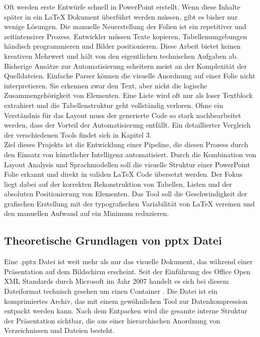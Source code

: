 \documentclass[a4paper]{article}
\begin{document}
 Oft werden erste Entwürfe schnell in PowerPoint erstellt. Wenn diese Inhalte später in ein LaTeX Dokument überführt werden müssen, gibt es bisher nur wenige Lösungen. Die manuelle Neuerstellung der Folien ist ein repetitiver und zeitintensiver Prozess. Entwickler müssen Texte kopieren, Tabellenumgebungen händisch programmieren und Bilder positionieren. Diese Arbeit bietet keinen kreativen Mehrwert und hält von den eigentlichen technischen Aufgaben ab. \\

Bisherige Ansätze zur Automatisierung scheitern meist an der Komplexität der Quelldateien. Einfache Parser können die visuelle Anordnung auf einer Folie nicht interpretieren. Sie erkennen zwar den Text, aber nicht die logische Zusammengehörigkeit von Elementen. Eine Liste wird oft nur als loser Textblock extrahiert und die Tabellenstruktur geht vollständig verloren. Ohne ein Verständnis für das Layout muss der generierte Code so stark nachbearbeitet werden, dass der Vorteil der Automatisierung entfällt. Ein detaillierter Vergleich der verschiedenen Tools findet sich in Kapitel 3. \\

Ziel dieses Projekts ist die Entwicklung einer Pipeline, die diesen Prozess durch den Einsatz von künstlicher Intelligenz automatisiert. Durch die Kombination von Layout Analysis und Sprachmodellen soll die visuelle Struktur einer PowerPoint Folie erkannt und direkt in validen LaTeX Code übersetzt werden. Der Fokus liegt dabei auf der korrekten Rekonstruktion von Tabellen, Listen und der absoluten Positionierung von Elementen. Das Tool soll die Geschwindigkeit der grafischen Erstellung mit der typografischen Variabilität von LaTeX vereinen und den manuellen Aufwand auf ein Minimum reduzieren. 
\subsection{Theoretische Grundlagen von pptx Datei} 

Eine .pptx Datei ist weit mehr als nur das visuelle Dokument, das während einer Präsentation auf dem Bildschirm erscheint. Seit der Einführung des Office Open XML Standards durch Microsoft im Jahr 2007 handelt es sich bei diesem Dateiformat technisch gesehen um einen Container \citep{MSOpenXML}. Die Datei ist ein komprimiertes Archiv, das mit einem gewöhnlichen Tool zur Datenkompression entpackt werden kann. Nach dem Entpacken wird die gesamte interne Struktur der Präsentation sichtbar, die aus einer hierarchischen Anordnung von Verzeichnissen und Dateien besteht. \\
\end{document}
